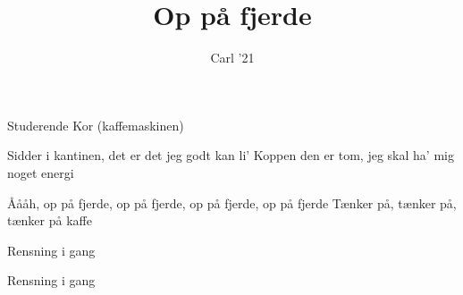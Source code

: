\documentclass[a4paper,11pt]{article}
\title{Op på fjerde}
\author{Carl '21}
\begin{document}
\maketitle

\begin{roles}
 Studerende
 Kor (kaffemaskinen)
\end{roles}


\begin{song}


 Sidder i kantinen, det er det jeg godt kan li'
    Koppen den er tom, jeg skal ha' mig noget energi

    Åååh, op på fjerde, op på fjerde, op på fjerde, op på fjerde
    Tænker på, tænker på, tænker på kaffe



 Rensning i gang


 Rensning i gang

    

\end{song}
\end{document}
